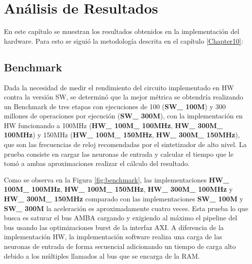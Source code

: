 
\chapter{Análisis de Resultados} %
\label{Chapter12}

En este capítulo se muestran los resultados obtenidos en la implementación del hardware. Para esto se siguió la metodología descrita en el capítulo \ref{Chapter10}: 
 
 \section{Benchmark}
Dada la necesidad de medir el rendimiento del circuito implementado en HW contra la versión SW, se determinó que la mejor métrica se obtendría realizando un Benchmark de tres etapas con ejecuciones de 100 (\textbf{SW\_ 100M}) y 300 millones de operaciones por ejecución (\textbf{SW\_ 300M}), con la implementación en HW funcionando a 100MHz (\textbf{HW\_ 100M\_ 100MHz}, \textbf{HW\_ 300M\_ 100MHz}) y 150MHz (\textbf{HW\_ 100M\_ 150MHz}, \textbf{HW\_ 300M\_ 150MHz}), que son las frecuencias de reloj recomendadas por el sintetizador de alto nivel. La prueba consiste en cargar las neuronas de entrada y calcular el tiempo que le tomó a ambas aproximaciones realizar el cálculo del resultado.

Como se observa en la Figura \ref{fig:benchmark}, las implementaciones \textbf{HW\_ 100M\_ 100MHz}, \textbf{HW\_ 100M\_ 150MHz}, \textbf{HW\_ 300M\_ 100MHz} y \textbf{HW\_ 300M\_ 150MHz} comparado con las implementaciones \textbf{SW\_ 100M} y \textbf{SW\_ 300M} la aceleración es aproximadamente cuatro veces. Esta prueba lo que busca es saturar el bus AMBA cargando y exigiendo al máximo el pipeline del bus usando las optimizaciones burst de la interfaz AXI. A diferencia de la implementación HW, la implementación software realiza una carga de las neuronas de entrada de forma secuencial adicionando un tiempo de carga alto debido a los múltiples llamados al bus que se encarga de la RAM.


